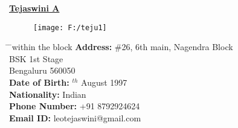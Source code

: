 \documentclass[10pt]{article}
\begin{document}
\hspace{4cm}
\underline{\textbf{\huge{Tejaswini A}}}

\begin{figure}[h]
	\hspace{5cm}
	\texttt{[image: F:/teju1]}
\end{figure}

\parbox{1.5\textwidth}{
	\begin{tabbing} 
		\hspace{3cm} \= \hspace{10cm} \= \kill within the block
		{\bf Address:} \> \#26, 6th main, Nagendra Block\\ 
		\> BSK 1st Stage\\ 
		\> Bengaluru 560050\\
		{\bf Date of Birth:} $^{th}$ August 1997  \\ 
		{\bf Nationality:} \> Indian\\
		{\bf Phone Number:} \> +91 8792924624\\
		{\bf Email ID:} \>leotejaswini@gmail.com\\
\end{tabbing}}

\hfill 
\end{document}
